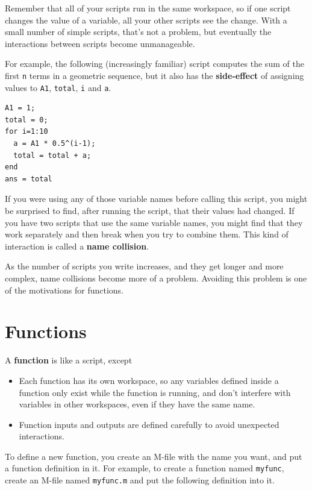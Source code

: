 \documentclass{book}
\begin{document}
Remember that all of your scripts run in the same workspace, so
if one script changes the value of a variable, all your other
scripts see the change. With a small number of simple scripts,
that's not a problem, but eventually the interactions between
scripts become unmanageable.

For example, the following (increasingly familiar) script computes the
sum of the first {\tt n} terms in a geometric sequence, but it also
has the {\bf side-effect} of assigning values to {\tt A1}, {\tt total},
{\tt i} and {\tt a}.

\begin{verbatim}
A1 = 1;
total = 0;
for i=1:10
  a = A1 * 0.5^(i-1);
  total = total + a;
end
ans = total
\end{verbatim}

If you were using any of those variable names before calling this
script, you might be surprised to find, after running the script,
that their values had changed. If you have two scripts that use
the same variable names, you might find that they work separately
and then break when you try to combine them. This kind of
interaction is called a {\bf name collision}.

As the number of scripts you write increases, and they get longer
and more complex, name collisions become more of a problem. Avoiding
this problem is one of the motivations for functions.


\section{Functions}
\label{functions}

A {\bf function} is like a script, except

\begin{itemize}

\item Each function has its own workspace, so any variables defined
inside a function only exist while the function is running, and don't
interfere with variables in other workspaces, even if they have the
same name.

\item Function inputs and outputs are defined carefully to avoid
unexpected interactions.

\end{itemize}

To define a new function, you create an M-file with the name you
want, and put a function definition in it. For example, to create
a function named {\tt myfunc}, create an M-file named {\tt myfunc.m}
and put the following definition into it.
\end{document}
